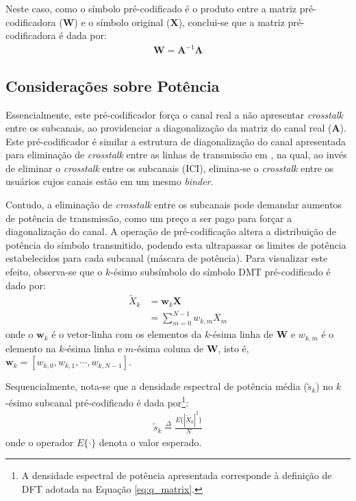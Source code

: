 Neste caso, como o símbolo pré-codificado é o produto entre a matriz pré-codificadora ($\mathbf{W}$) e o símbolo original ($\mathbf{X}$), conclui-se que a matriz pré-codificadora é dada por:
\begin{align}
\mathbf{W} =  \mathbf{A}^{-1}\mathbf{\Lambda}
\label{eq:prec_no_norm}
\end{align}

\subsection{Considerações sobre Potência}

Essencialmente, este pré-codificador força o canal real a não apresentar \textsl{crosstalk} entre os subcanais, ao providenciar a diagonalização da matriz do canal real ($\mathbf{A}$). Este pré-codificador é similar a estrutura de diagonalização do canal apresentada para eliminação de \textsl{crosstalk} entre as linhas de transmissão em \cite{Cendrillon07}, na qual, ao invés de eliminar o \textsl{crosstalk} entre os subcanais (ICI), elimina-se o \textsl{crosstalk} entre os usuários cujos canais estão em um mesmo \textsl{binder}. 

Contudo, a eliminação de \textsl{crosstalk} entre os subcanais pode demandar aumentos de potência de transmissão, como um preço a ser pago para forçar a diagonalização do canal. A operação de pré-codificação altera a distribuição de potência do símbolo transmitido, podendo esta ultrapassar os limites de potência estabelecidos para cada subcanal (máscara de potência). Para visualizar este efeito, observa-se que o $k$-ésimo subsímbolo do símbolo DMT pré-codificado é dado por:
\begin{align}
\tilde{X}_k &= \mathbf{w}_k \mathbf{X}\nonumber\\
&= \sum \limits_{m=0}^{N-1} w_{k,m} X_m
\label{eq:xtilde_innerp}
\end{align}
onde o $\mathbf{w}_k $ é o vetor-linha com os elementos da $k$-ésima linha de $\mathbf{W}$ e $w_{k,m}$ é o elemento na $k$-ésima linha e $m$-ésima coluna de $\mathbf{W}$, isto é, $\mathbf{w}_k  = \left[ w_{k,0}, w_{k,1}, \cdots, w_{k,N-1} \right]$.

Sequencialmente, nota-se que a densidade espectral de potência média ($\tilde{s}_k$) no $k$-ésimo subcanal pré-codificado é dada por\footnote{A densidade espectral de potência apresentada corresponde à definição de DFT adotada na Equação \ref{eq:q_matrix}.}:
\begin{align}
\tilde{s}_k \stackrel{\Delta}{=} \frac{E \{ \left| \tilde{X}_k \right|^2 \}}{N}
\label{eq:psd_definition}
\end{align}
onde o operador $E\{ \cdot \}$ denota o valor esperado.


